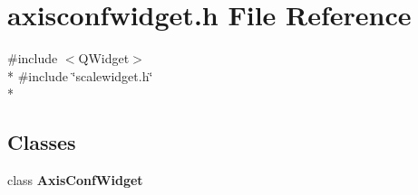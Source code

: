 \section{axisconfwidget.\+h File Reference}
\label{axisconfwidget_8h}
{\ttfamily \#include $<$Q\+Widget$>$}\\*
{\ttfamily \#include \char`\"{}scalewidget.\+h\char`\"{}}\\*
\subsection*{Classes}
\begin{DoxyCompactItemize}
\item 
class {\bf Axis\+Conf\+Widget}
\end{DoxyCompactItemize}
